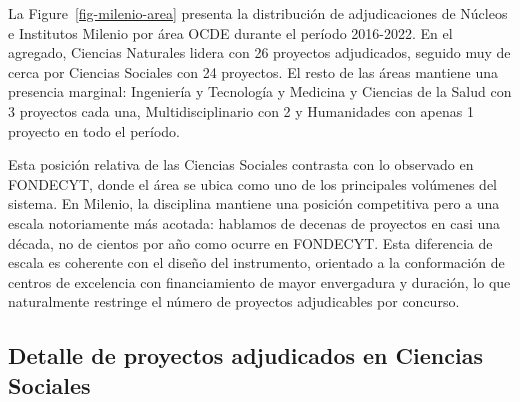 \documentclass[
  12pt,
  letterpaper,
]{article}
\begin{document}
La Figure~\ref{fig-milenio-area} presenta la distribución de
adjudicaciones de Núcleos e Institutos Milenio por área OCDE durante el
período 2016-2022. En el agregado, Ciencias Naturales lidera con 26
proyectos adjudicados, seguido muy de cerca por Ciencias Sociales con 24
proyectos. El resto de las áreas mantiene una presencia marginal:
Ingeniería y Tecnología y Medicina y Ciencias de la Salud con 3
proyectos cada una, Multidisciplinario con 2 y Humanidades con apenas 1
proyecto en todo el período.

Esta posición relativa de las Ciencias Sociales contrasta con lo
observado en FONDECYT, donde el área se ubica como uno de los
principales volúmenes del sistema. En Milenio, la disciplina mantiene
una posición competitiva pero a una escala notoriamente más acotada:
hablamos de decenas de proyectos en casi una década, no de cientos por
año como ocurre en FONDECYT. Esta diferencia de escala es coherente con
el diseño del instrumento, orientado a la conformación de centros de
excelencia con financiamiento de mayor envergadura y duración, lo que
naturalmente restringe el número de proyectos adjudicables por concurso.

\subsection{Detalle de proyectos adjudicados en Ciencias
Sociales}\label{detalle-de-proyectos-adjudicados-en-ciencias-sociales}
\end{document}
